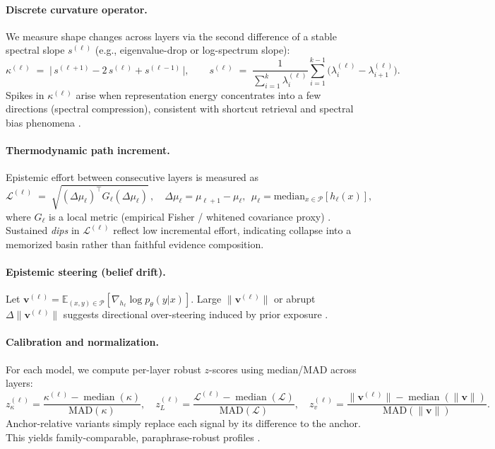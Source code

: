 \documentclass[11pt]{article}
\begin{document}
\paragraph{Discrete curvature operator.} We measure shape changes across layers via the second difference of a stable spectral slope $s^{(\ell)}$ (e.g., eigenvalue-drop or log-spectrum slope):
\[
\kappa^{(\ell)} \;=\; \big|\, s^{(\ell+1)} - 2\,s^{(\ell)} + s^{(\ell-1)} \,\big|,\qquad
s^{(\ell)} \;=\; \frac{1}{\sum_{i=1}^k \lambda^{(\ell)}_i}\sum_{i=1}^{k-1}\!\big(\lambda^{(\ell)}_i-\lambda^{(\ell)}_{i+1}\big).
\]
Spikes in $\kappa^{(\ell)}$ arise when representation energy concentrates into a few directions (spectral compression), consistent with shortcut retrieval and spectral bias phenomena \citep{ansuini2019intrinsic,rahaman2019spectral,belkin2019reconciling}.

\paragraph{Thermodynamic path increment.} Epistemic effort between consecutive layers is measured as
\[
\mathcal{L}^{(\ell)} \;=\; \sqrt{(\Delta\mu_\ell)^\top G_\ell (\Delta\mu_\ell)}\,,\quad
\Delta\mu_\ell=\mu_{\ell+1}-\mu_{\ell},\ \ \mu_\ell=\mathrm{median}_{x\in\mathcal{P}}[h_\ell(x)],
\]
where $G_\ell$ is a local metric (empirical Fisher / whitened covariance proxy) \citep{amari2016ig,crooks2007measuring}. Sustained \emph{dips} in $\mathcal{L}^{(\ell)}$ reflect low incremental effort, indicating collapse into a memorized basin rather than faithful evidence composition.

\paragraph{Epistemic steering (belief drift).} Let $\mathbf{v}^{(\ell)}=\mathbb{E}_{(x,y)\in\mathcal{P}}[\nabla_{h_\ell}\log p_\theta(y|x)]$. Large $\|\mathbf{v}^{(\ell)}\|$ or abrupt $\Delta\|\mathbf{v}^{(\ell)}\|$ suggests directional over-steering induced by prior exposure \citep{ouyang2022instructgpt,rafailov2023dpo,bai2022harmless}.

\paragraph{Calibration and normalization.} For each model, we compute per-layer robust $z$-scores using median/MAD across layers:
\[
z_\kappa^{(\ell)}=\frac{\kappa^{(\ell)}-\operatorname{median}(\kappa)}{\mathrm{MAD}(\kappa)},\quad
z_L^{(\ell)}=\frac{\mathcal{L}^{(\ell)}-\operatorname{median}(\mathcal{L})}{\mathrm{MAD}(\mathcal{L})},\quad
z_v^{(\ell)}=\frac{\|\mathbf{v}^{(\ell)}\|-\operatorname{median}(\|\mathbf{v}\|)}{\mathrm{MAD}(\|\mathbf{v}\|)}.
\]
Anchor-relative variants simply replace each signal by its difference to the anchor. This yields family-comparable, paraphrase-robust profiles \citep{ribeiro2020checklist,iyyer2018scpn,kornblith2019cka}.
\end{document}

